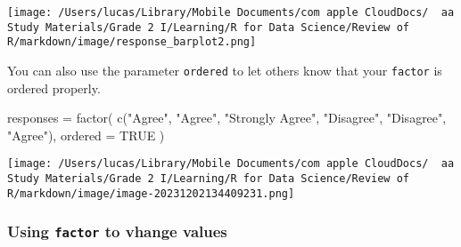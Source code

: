 \documentclass[
]{article}
\let\oldincludegraphics\includegraphics
\renewcommand{\includegraphics}[2][]{\begin{center}\oldincludegraphics[#1]{#2}\end{center}}
\newenvironment{Shaded}{}{}
\newcommand{\AttributeTok}[1]{\textcolor[rgb]{0.49,0.56,0.16}{#1}}
\newcommand{\CommentTok}[1]{\textcolor[rgb]{0.38,0.63,0.69}{\textit{#1}}}
\newcommand{\ConstantTok}[1]{\textcolor[rgb]{0.53,0.00,0.00}{#1}}
\newcommand{\FunctionTok}[1]{\textcolor[rgb]{0.02,0.16,0.49}{#1}}
\newcommand{\NormalTok}[1]{#1}
\newcommand{\OtherTok}[1]{\textcolor[rgb]{0.00,0.44,0.13}{#1}}
\newcommand{\SpecialCharTok}[1]{\textcolor[rgb]{0.25,0.44,0.63}{#1}}
\newcommand{\StringTok}[1]{\textcolor[rgb]{0.25,0.44,0.63}{#1}}
\begin{document}
\begin{Shaded}
\end{Shaded}

\texttt{[image: /Users/lucas/Library/Mobile Documents/com~apple~CloudDocs/~~aa Study Materials/Grade 2 I/Learning/R for Data Science/Review of R/markdown/image/response\_barplot2.png]}

You can also use the parameter \texttt{ordered} to let others know that
your \texttt{factor} is ordered properly.

\begin{Shaded}
\begin{Highlighting}[]
\NormalTok{responses }\OtherTok{=}
  \FunctionTok{factor}\NormalTok{(}
    \FunctionTok{c}\NormalTok{(}\StringTok{"Agree"}\NormalTok{, }\StringTok{"Agree"}\NormalTok{, }\StringTok{"Strongly Agree"}\NormalTok{, }\StringTok{"Disagree"}\NormalTok{, }\StringTok{"Disagree"}\NormalTok{, }\StringTok{"Agree"}\NormalTok{),}
    \AttributeTok{ordered =} \ConstantTok{TRUE}
\NormalTok{  )}
\end{Highlighting}
\end{Shaded}

\texttt{[image: /Users/lucas/Library/Mobile Documents/com~apple~CloudDocs/~~aa Study Materials/Grade 2 I/Learning/R for Data Science/Review of R/markdown/image/image-20231202134409231.png]}

\hypertarget{using-factor-to-vhange-values}{%
\subsubsection{\texorpdfstring{Using \texttt{factor} to vhange
values}{Using factor to vhange values}}\label{using-factor-to-vhange-values}}
\end{document}
